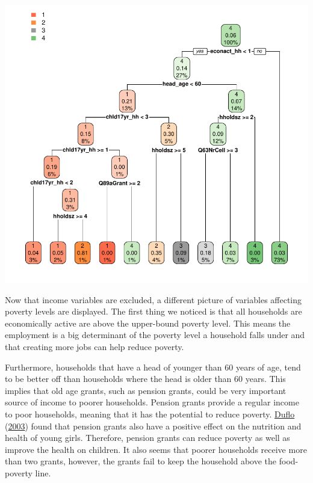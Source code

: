 \documentclass[11pt,preprint, authoryear]{elsarticle}
\let\origfigure\figure
\let\endorigfigure\endfigure
\renewenvironment{figure}[1][2] {
    \expandafter\origfigure\expandafter[H]
} {
    \endorigfigure
}
\numberwithin{equation}{section}
\numberwithin{figure}{section}
\numberwithin{table}{section}
\begin{document}
\begin{figure}[H]

{\centering \includegraphics{Predicting-Poverty_files/figure-latex/Figure8-1} 

}

\caption{Decision Tree excluding income variables\label{Figure8}}\label{fig:Figure8}
\end{figure}

Now that income variables are excluded, a different picture of variables
affecting poverty levels are displayed. The first thing we noticed is
that all households are economically active are above the upper-bound
poverty level. This means the employment is a big determinant of the
poverty level a household falls under and that creating more jobs can
help reduce poverty.

Furthermore, households that have a head of younger than 60 years of
age, tend to be better off than households where the head is older than
60 years. This implies that old age grants, such as pension grants,
could be very important source of income to poorer households. Pension
grants provide a regular income to poor households, meaning that it has
the potential to reduce poverty.
\protect\hyperlink{ref-duflo2003}{Duflo}
(\protect\hyperlink{ref-duflo2003}{2003}) found that pension grants also
have a positive effect on the nutrition and health of young girls.
Therefore, pension grants can reduce poverty as well as improve the
health on children. It also seems that poorer households receive more
than two grants, however, the grants fail to keep the household above
the food-poverty line.
\end{document}
